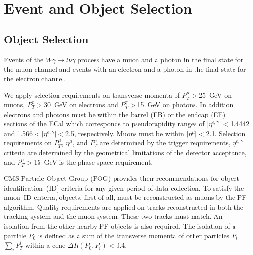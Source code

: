 \section{Event and Object Selection}
\label{sec:AN_Selection}

\subsection{Object Selection}
\label{sec:AN_ObjectSelection}

Events of the $W\gamma\rightarrow l\nu\gamma$ process have a muon and a photon in the final state for the muon channel and events with an electron and a photon in the final state for the electron channel. 

We apply selection requirements on transverse momenta of $P_T^{\mu}>$25~GeV on muons,  $P_T^e>$30~GeV on electrons and $P_T^{\gamma}>$15~GeV on photons. In addition, electrons and photons must be within the barrel (EB) or the endcap (EE) sections of the ECal which corresponds to pseudorapidity ranges of $|\eta^{e,\gamma}| < $1.4442 and 1.566$ < |\eta^{e,\gamma}| < $2.5, respectively. Muons must be within $|\eta^{\mu}|<$2.1. Selection requirements on $P_T^{\mu}$, $\eta^{\mu}$, and $P_T^e$ are determined by the trigger requirements, $\eta^{e,\gamma}$ criteria are determined by the geometrical limitations of the detector acceptance, and $P_T^{\gamma}>$15~GeV is the phase space requirement.

CMS Particle Object Group (POG) provides their recommendations for object identification~(ID) criteria for any given period of data collection. To satisfy the muon~ID criteria, objects, first of all, must be reconstructed as muons by the PF algorithm. Quality requirements are applied on tracks reconstructed in both the tracking system and the muon system. These two tracks must match. An isolation from the other nearby PF objects is also required. The isolation of a particle $P_0$ is defined as a sum of the transverse momenta of other particles $P_i$ $\sum_i P_T^{i}$ within a cone $\Delta R(P_0,P_i)<$0.4. 




